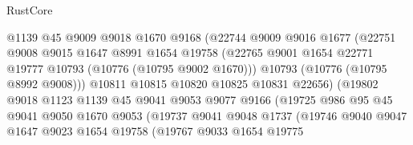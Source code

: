 \begin{lexlean}{RustCore}
\begin{coremodule}
                              @1139
                              @45
                              @9009
                              @9018
                              @1670
                              @9168
                              (@22744
                                @9009
                                @9016
                                @1677
                                (@22751
                                  @9008
                                  @9015
                                  @1647
                                  @8991
                                  @1654
                                  @19758
                                  (@22765
                                    @9001
                                    @1654
                                    @22771
                                    @19777
                                    @10793
                                    (@10776 (@10795 @9002 @1670)))
                                  @10793
                                  (@10776 (@10795 @8992 @9008)))
                                @10811
                                @10815
                                @10820
                                @10825
                                @10831
                                @22656)
                              (@19802
                                @9018
                                @1123
                                @1139
                                @45
                                @9041
                                @9053
                                @9077
                                @9166
                                (@19725
                                  @986
                                  @95
                                  @45
                                  @9041
                                  @9050
                                  @1670
                                  @9053
                                  (@19737
                                    @9041
                                    @9048
                                    @1737
                                    (@19746
                                      @9040
                                      @9047
                                      @1647
                                      @9023
                                      @1654
                                      @19758
                                      (@19767
                                        @9033
                                        @1654
                                        @19775

\end{coremodule}
\end{lexlean}
